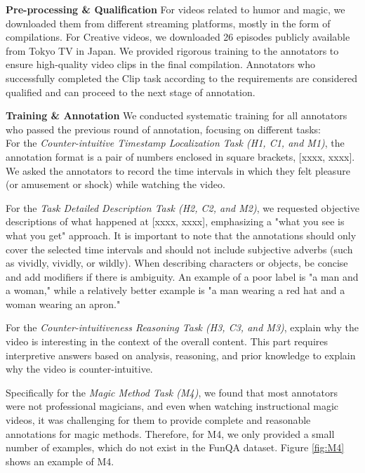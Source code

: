 \noindent\textbf{Pre-processing \& Qualification}\quad
For videos related to humor and magic, we downloaded them from different streaming platforms, mostly in the form of compilations. For Creative videos, we downloaded 26 episodes publicly available from Tokyo TV in Japan. We provided rigorous training to the annotators to ensure high-quality video clips in the final compilation. Annotators who successfully completed the Clip task according to the requirements are considered qualified and can proceed to the next stage of annotation.

\noindent\textbf{Training \& Annotation}\quad
We conducted systematic training for all annotators who passed the previous round of annotation, focusing on different tasks: \\
For the \textit{Counter-intuitive Timestamp Localization Task (H1, C1, and M1)}, the annotation format is a pair of numbers enclosed in square brackets, [xxxx, xxxx]. We asked the annotators to record the time intervals in which they felt pleasure (or amusement or shock) while watching the video. 

For the \textit{Task Detailed Description Task (H2, C2, and M2)}, we requested objective descriptions of what happened at [xxxx, xxxx], emphasizing a "what you see is what you get" approach. It is important to note that the annotations should only cover the selected time intervals and should not include subjective adverbs (such as vividly, vividly, or wildly). When describing characters or objects, be concise and add modifiers if there is ambiguity. An example of a poor label is "a man and a woman," while a relatively better example is "a man wearing a red hat and a woman wearing an apron." 

For the \textit{Counter-intuitiveness Reasoning Task (H3, C3, and M3)}, explain why the video is interesting in the context of the overall content. This part requires interpretive answers based on analysis, reasoning, and prior knowledge to explain why the video is counter-intuitive.

Specifically for the \textit{Magic Method Task (M4)}, we found that most annotators were not professional magicians, and even when watching instructional magic videos, it was challenging for them to provide complete and reasonable annotations for magic methods. Therefore, for M4, we only provided a small number of examples, which do not exist in the FunQA dataset. Figure \ref{fig:M4} shows an example of M4.

